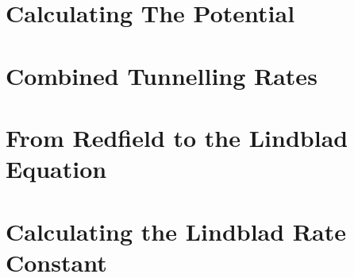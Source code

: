 \documentclass{article}
\begin{document}
\pagebreak
\printbibliography{}
\pagebreak
\begin{appendix}
    \section{Calculating The Potential}\label{app:interaction potential calculation}
    

    \section{Combined Tunnelling Rates}\label{app:combined tunnelling rates}
    

    \section{From Redfield to the Lindblad Equation}\label{app:redfield to lindblad}
    

    \section{Calculating the Lindblad Rate Constant}\label{app:calculating gamma}
    
\end{appendix}
\end{document}
